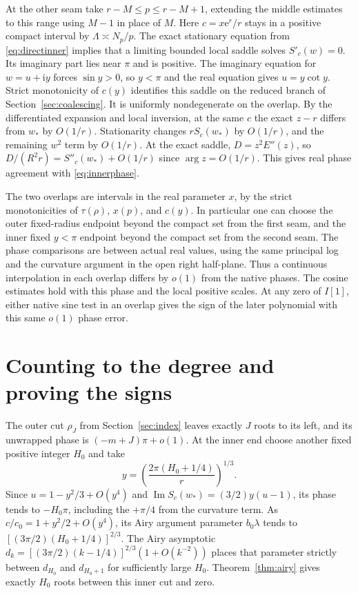 \documentclass[11pt]{article}
\DeclareMathOperator{\Ima}{Im}
\newcommand{\ee}{\mathrm e}
\newcommand{\ii}{\mathrm i}
\begin{document}
At the other seam take \(r-M\le p\le r-M+1\), extending the middle estimates to this range using \(M-1\) in place of \(M\). Here \(c=x\ee^r/r\) stays in a positive compact interval by \(\Lambda\asymp N_p/p\). The exact stationary equation from \eqref{eq:directinner} implies that a limiting bounded local saddle solves \(S'_c(w)=0\). Its imaginary part lies near \(\pi\) and is positive. The imaginary equation for \(w=u+\ii y\) forces \(\sin y>0\), so \(y<\pi\) and the real equation gives \(u=y\cot y\). Strict monotonicity of \(c(y)\) identifies this saddle on the reduced branch of Section~\ref{sec:coalescing}. It is uniformly nondegenerate on the overlap. By the differentiated expansion and local inversion, at the same \(c\) the exact \(z-r\) differs from \(w_*\) by \(O(1/r)\). Stationarity changes \(r S_c(w_*)\) by \(O(1/r)\), and the remaining \(w^2\) term by \(O(1/r)\). At the exact saddle, \(D=z^2 E''(z)\), so \(D/(R^2 r)=S''_c(w_*)+O(1/r)\) since \(\arg z=O(1/r)\). This gives real phase agreement with \eqref{eq:innerphase}.

The two overlaps are intervals in the real parameter \(x\), by the strict monotonicities of \(\tau(\rho)\), \(x(p)\), and \(c(y)\). In particular one can choose the outer fixed-radius endpoint beyond the compact set from the first seam, and the inner fixed \(y<\pi\) endpoint beyond the compact set from the second seam. The phase comparisons are between actual real values, using the same principal log and the curvature argument in the open right half-plane. Thus a continuous interpolation in each overlap differs by \(o(1)\) from the native phases. The cosine estimates hold with this phase and the local positive scales. At any zero of \(I[1]\), either native sine test in an overlap gives the sign of the later polynomial with this same \(o(1)\) phase error.

\section{Counting to the degree and proving the signs}\label{sec:saturation}

The outer cut \(\rho_J\) from Section~\ref{sec:index} leaves exactly \(J\) roots to its left, and its unwrapped phase is \((-m+J)\pi+o(1)\). At the inner end choose another fixed positive integer \(H_0\) and take
\[
 y=\left(\frac{2\pi(H_0+1/4)}{r}\right)^{1/3}.
\]
Since \(u=1-y^2/3+O(y^4)\) and
\(\Ima S_c(w_*)=(3/2)y(u-1)\), its phase tends to \(-H_0\pi\), including the \(+\pi/4\) from the curvature term. As \(c/c_0=1+y^2/2+O(y^4)\), its Airy argument parameter \(b_0\lambda\) tends to \([(3\pi/2)(H_0+1/4)]^{2/3}\). The Airy asymptotic \(d_k=[(3\pi/2)(k-1/4)]^{2/3}(1+O(k^{-2}))\) places that parameter strictly between \(d_{H_0}\) and \(d_{H_0+1}\) for sufficiently large \(H_0\). Theorem~\ref{thm:airy} gives exactly \(H_0\) roots between this inner cut and zero.
\end{document}
